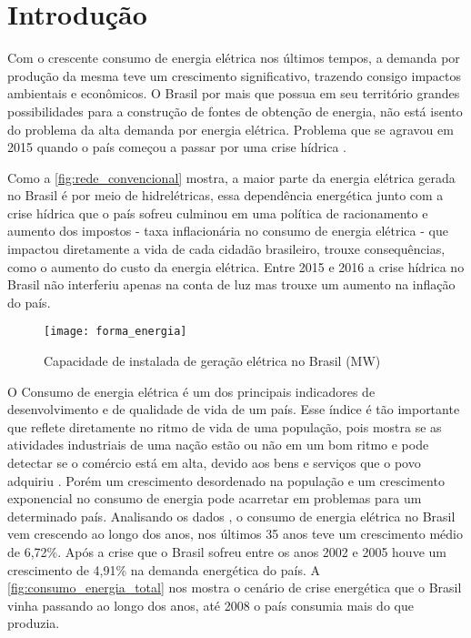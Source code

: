 \chapter[Introdução]{Introdução}
\label{ch:introdução}
Com o crescente consumo de energia elétrica nos últimos tempos, a demanda por produção da mesma teve um crescimento significativo, trazendo consigo 
impactos ambientais e econômicos. O Brasil por mais que possua em seu território grandes possibilidades para a construção de fontes de obtenção de energia, não
está isento do problema da alta demanda por energia elétrica. Problema que se agravou em 2015 quando o país começou a passar por
uma crise hídrica \cite{crise-hidrica-2015}.

Como a \autoref{fig:rede_convencional} mostra, a maior parte da energia elétrica gerada no Brasil é por meio de hidrelétricas, essa dependência
energética junto com a crise hídrica que o país sofreu culminou em uma política de racionamento e aumento dos impostos - taxa inflacionária no
consumo de energia elétrica - que impactou diretamente a vida de cada cidadão brasileiro, trouxe consequências, como o aumento do 
custo da energia elétrica. Entre 2015 e 2016 a crise hídrica no Brasil não interferiu apenas na conta de luz mas trouxe
um aumento na inflação do país.




\begin{figure}[h!]
	\texttt{[image: forma\_energia]}
	\centering
	\caption[Capacidade de instalada de geração elétrica no Brasil (MW)]{Capacidade de instalada de geração elétrica no Brasil (MW)}
	\label{fig:rede_convencional}
\end{figure}
\FloatBarrier


O Consumo de energia elétrica é um dos principais indicadores de desenvolvimento e de qualidade de vida 
de um país. Esse índice é tão importante que reflete diretamente no ritmo de vida de uma população, pois mostra
se as atividades industriais de uma nação estão ou não em um bom ritmo e pode detectar se o comércio está em alta,
devido aos bens e serviços que o povo adquiriu \cite{energia-desenvolvimento}. Porém um crescimento desordenado na população e um crescimento
exponencial no consumo de energia pode acarretar em problemas para um determinado país.
Analisando os dados \cite{epe-balanco-final}, o consumo de energia
elétrica no Brasil vem crescendo ao longo dos anos, nos últimos 35 anos teve um crescimento médio de 6,72\%. Após a crise que o Brasil sofreu entre os anos 2002 e 2005 houve um crescimento
de 4,91\% na demanda energética do país. A \autoref{fig:consumo_energia_total} nos mostra o cenário de crise energética que o Brasil vinha
passando ao longo dos anos, até 2008 o país consumia mais do que produzia.

